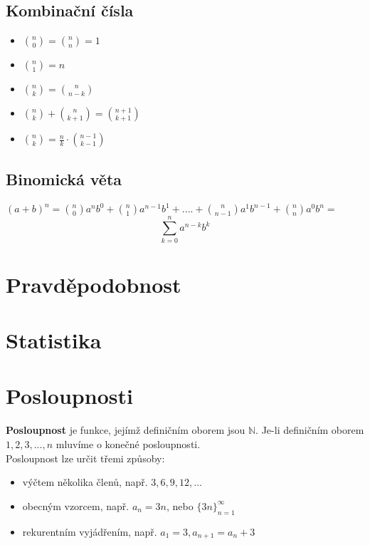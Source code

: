 \documentclass[12pt, a4paper]{article}
\begin{document}
\subsection*{Kombinační čísla}
\begin{itemize}
	\item ${{n}\choose{0}}={{n}\choose{n}}=1$
	\item ${{n}\choose{1}}=n$
	\item ${{n}\choose{k}}={{n}\choose{n-k}}$
	\item ${{n}\choose{k}}+{{n}\choose{k+1}}={{n+1}\choose{k+1}}$
	\item ${{n}\choose{k}} = \frac{n}{k}\cdot {{n-1}\choose{k-1}}$
\end{itemize}

\subsection*{Binomická věta}
$(a+b)^n = {{n}\choose{0}}a^nb^0 + {{n}\choose{1}}a^{n-1}b^1 + .... + {{n}\choose{n-1}}a^1b^{n-1} + {{n}\choose{n}}a^0b^n =$
\[ \sum_{k=0}^{n}a^{n-k}b^k \]

\section{Pravděpodobnost}
\section{Statistika}
\section{Posloupnosti}
\textbf{Posloupnost} je funkce, jejímž definičním oborem jsou $\mathbb{N}$. Je-li definičním oborem ${1,2,3,...,n}$ mluvíme o konečné posloupnosti.\\
Posloupnost lze určit třemi způsoby:
\begin{itemize}
	\item výčtem několika členů, např. $3, 6, 9, 12, ...$
	\item obecným vzorcem, např. $a_n = 3n$, nebo $\{3n\}_{n=1}^{\infty}$
	\item rekurentním vyjádřením, např. $a_1=3, a_{n+1}=a_n+3$
\end{itemize}
\end{document}
